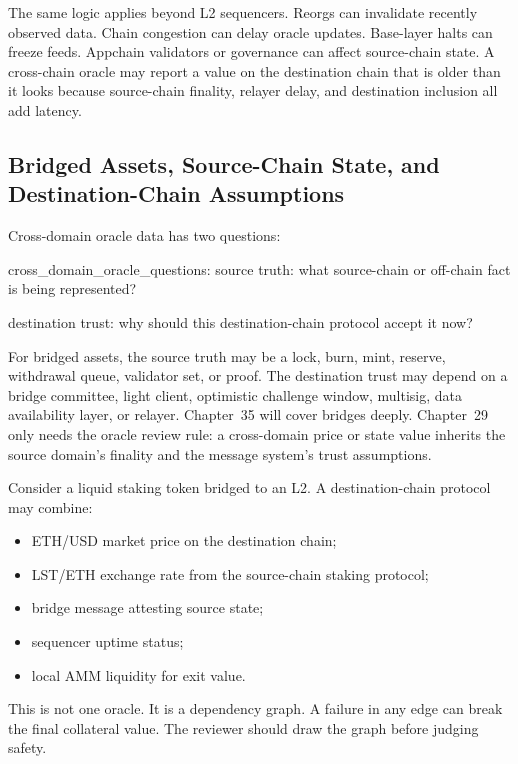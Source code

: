 The same logic applies beyond L2 sequencers. Reorgs can invalidate recently observed data. Chain congestion can delay oracle updates. Base-layer halts can freeze feeds. Appchain validators or governance can affect source-chain state. A cross-chain oracle may report a value on the destination chain that is older than it looks because source-chain finality, relayer delay, and destination inclusion all add latency.

\subsection{Bridged Assets, Source-Chain State, and Destination-Chain Assumptions}

Cross-domain oracle data has two questions:

\begin{codeblock}
cross_domain_oracle_questions:
    source truth:
        what source-chain or off-chain fact is being represented?

    destination trust:
        why should this destination-chain protocol accept it now?
\end{codeblock}

For bridged assets, the source truth may be a lock, burn, mint, reserve, withdrawal queue, validator set, or proof. The destination trust may depend on a bridge committee, light client, optimistic challenge window, multisig, data availability layer, or relayer. Chapter~35 will cover bridges deeply. Chapter~29 only needs the oracle review rule: a cross-domain price or state value inherits the source domain's finality and the message system's trust assumptions.

Consider a liquid staking token bridged to an L2. A destination-chain protocol may combine:

\begin{itemize}
\item ETH/USD market price on the destination chain;
\item LST/ETH exchange rate from the source-chain staking protocol;
\item bridge message attesting source state;
\item sequencer uptime status;
\item local AMM liquidity for exit value.
\end{itemize}

This is not one oracle. It is a dependency graph. A failure in any edge can break the final collateral value. The reviewer should draw the graph before judging safety.

